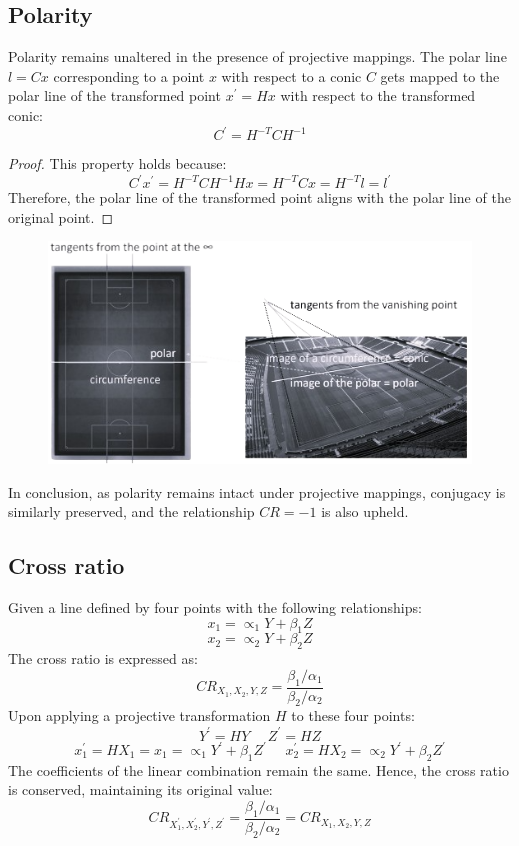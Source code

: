 \subsection*{Polarity}
Polarity remains unaltered in the presence of projective mappings.
The polar line $l=Cx$ corresponding to a point $x$ with respect to a conic $C$ gets mapped to the polar line of the transformed point $x^{'} = Hx$ with respect to the transformed conic:
\[C^{'}=H^{-T}CH^{-1}\]
\begin{proof}
    This property holds because:
    \[C^{'}x^{'}=H^{-T}CH^{-1}Hx=H^{-T}Cx=H^{-T}l=l^{'}\]
    Therefore, the polar line of the transformed point aligns with the polar line of the original point.
\end{proof}
\begin{figure}[H]
    \centering
    \includegraphics[width=0.75\linewidth]{images/polarity.png}
\end{figure}
In conclusion, as polarity remains intact under projective mappings, conjugacy is similarly preserved, and the relationship $CR=-1$ is also upheld.

\subsection*{Cross ratio}
Given a line defined by four points with the following relationships:
\[x_1=\propto_1Y+\beta_1Z\]
\[x_2=\propto_2Y+\beta_2Z\]
The cross ratio is expressed as:
\[CR_{X_1,X_2,Y,Z}=\dfrac{\beta_1/\alpha_1}{\beta_2/\alpha_2}\]
Upon applying a projective transformation $H$ to these four points:
\[Y^{'}=HY \:\:\:\:\:\: Z^{'}=HZ\] 
\[x^{'}_1=HX_1=x_1=\propto_1Y^{'}+\beta_1Z^{'} \:\:\:\:\:\: x^{'}_2=HX_2=\propto_2Y^{'}+\beta_2Z^{'}\]
The coefficients of the linear combination remain the same. 
Hence, the cross ratio is conserved, maintaining its original value:
\[CR_{X_1^{'},X_2^{'},Y^{'},Z^{'}}=\dfrac{\beta_1/\alpha_1}{\beta_2/\alpha_2}=CR_{X_1,X_2,Y,Z}\]


